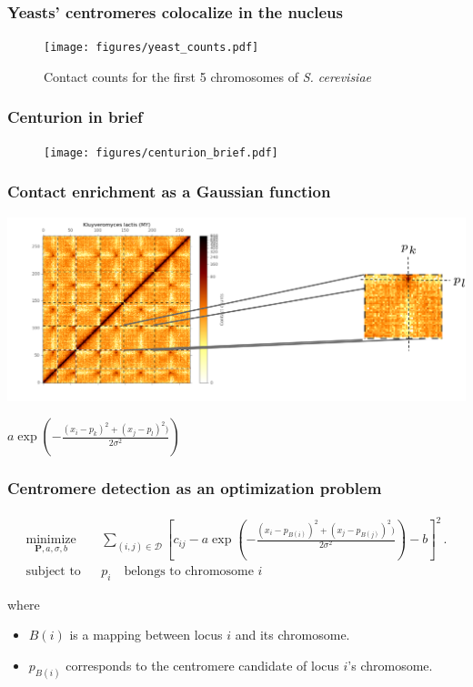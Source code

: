 \documentclass[xcolor=dvipsnames]{beamer}
\begin{document}
\begin{frame}
\frametitle{Yeasts' centromeres colocalize in the nucleus}
\begin{figure}
\texttt{[image: figures/yeast\_counts.pdf]}
\caption{Contact counts for the first 5 chromosomes of \textit{S. cerevisiae}}
\end{figure}
\end{frame}

\begin{frame}
\frametitle{Centurion in brief}
\begin{figure}
\texttt{[image: figures/centurion\_brief.pdf]}
\end{figure}
\end{frame}

\begin{frame}
\frametitle{Contact enrichment as a Gaussian function}
\includegraphics[width=\linewidth]{figures/centurion_idea.png}
\begin{flushright}
$a\exp \left(- \frac{(x_i -
p_k)^2 + (x_j - p_l)^2)}{2\sigma^2}\right)$
\end{flushright}
\end{frame}

\begin{frame}
\frametitle{Centromere detection as an optimization problem}

\begin{equation*}
\renewcommand{\arraystretch}{2}
\begin{array}{ccll}
\underset{\textbf{P}, a, \sigma, b}{\text{minimize}} & &
\sum_{(i,j)\in\mathcal{D}} \left[ c_{ij} - a\exp \left(- \frac{(x_i -
p_{B(i)})^2 + (x_j - p_{B(j)})^2)}{2\sigma^2}\right) - b \right]^2\,. \\
\text{subject to} & & p_i\quad\text{belongs to chromosome }i
\end{array}
\end{equation*}

where
\begin{itemize}[label={$\bullet$}]
\item $B(i)$ is a mapping between locus $i$ and its chromosome.
\item $p_{B(i)}$ corresponds to the centromere candidate of locus $i$'s
chromosome.
\end{itemize}
\end{frame}
\end{document}
